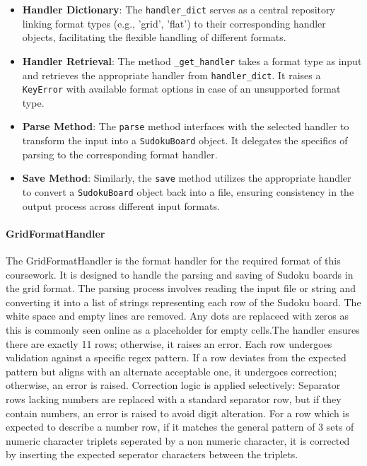 \documentclass[11pt]{article}
\begin{document}
\begin{itemize}
    \item \textbf{Handler Dictionary}: The \texttt{handler\_dict} serves as a central repository linking format types (e.g., 'grid', 'flat') to their corresponding handler objects, facilitating the flexible handling of different formats.
    \item \textbf{Handler Retrieval}: The method \texttt{\_get\_handler} takes a format type as input and retrieves the appropriate handler from \texttt{handler\_dict}. It raises a \texttt{KeyError} with available format options in case of an unsupported format type.
    \item \textbf{Parse Method}: The \texttt{parse} method interfaces with the selected handler to transform the input into a \texttt{SudokuBoard} object. It delegates the specifics of parsing to the corresponding format handler.
    \item \textbf{Save Method}: Similarly, the \texttt{save} method utilizes the appropriate handler to convert a \texttt{SudokuBoard} object back into a file, ensuring consistency in the output process across different input formats.
\end{itemize}

\paragraph{GridFormatHandler}
The GridFormatHandler is the format handler for the required format of this coursework. It is designed to handle the parsing and saving of Sudoku boards in the grid format. The parsing process involves reading the input file or string and converting it into a list of strings representing each row of the Sudoku board. The white space and empty lines are removed. Any dots are replacecd with zeros as this is commonly seen online as a placeholder for empty cells.The handler ensures there are exactly 11 rows; otherwise, it raises an error. Each row undergoes validation against a specific regex pattern. If a row deviates from the expected pattern but aligns with an alternate acceptable one, it undergoes correction; otherwise, an error is raised. Correction logic is applied selectively: Separator rows lacking numbers are replaced with a standard separator row, but if they contain numbers, an error is raised to avoid digit alteration. For a row which is expected to describe a number row, if it matches the general pattern of 3 sets of numeric character triplets seperated by a non numeric character, it is corrected by inserting the expected seperator characters between the triplets.
\end{document}
